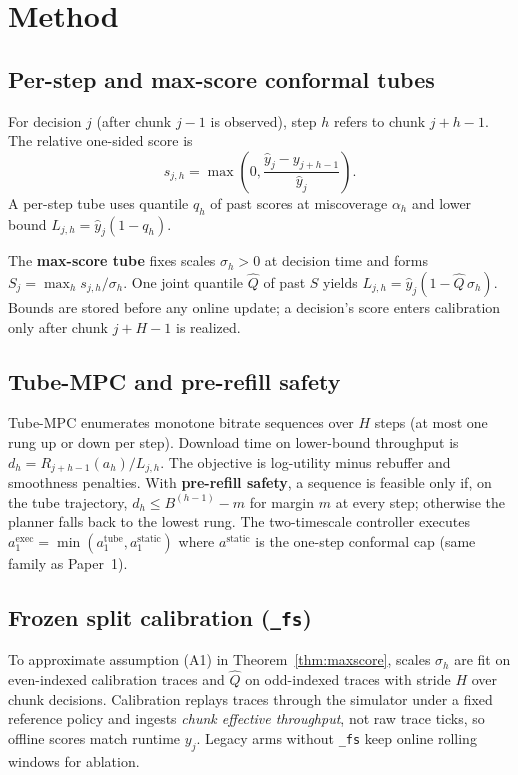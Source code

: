 \section{Method}
\label{sec:method}

\subsection{Per-step and max-score conformal tubes}
\label{sec:method:maxscore}

For decision \(j\) (after chunk \(j{-}1\) is observed), step \(h\) refers to chunk \(j{+}h{-}1\).
The relative one-sided score is
\[
  s_{j,h} = \max\!\left(0,\frac{\hat y_j - y_{j+h-1}}{\hat y_j}\right).
\]
A per-step tube uses quantile \(q_h\) of past scores at miscoverage \(\alpha_h\) and lower bound \(L_{j,h} = \hat y_j(1-q_h)\).

The \textbf{max-score tube} fixes scales \(\sigma_h>0\) at decision time and forms
\(S_j = \max_h s_{j,h}/\sigma_h\).
One joint quantile \(\widehat Q\) of past \(S\) yields
\(L_{j,h} = \hat y_j(1 - \widehat Q\,\sigma_h)\).
Bounds are stored before any online update; a decision's score enters calibration only after chunk \(j{+}H{-}1\) is realized.

\subsection{Tube-MPC and pre-refill safety}
\label{sec:method:mpc}

Tube-MPC enumerates monotone bitrate sequences over \(H\) steps (at most one rung up or down per step).
Download time on lower-bound throughput is \(d_h = R_{j+h-1}(a_h) / L_{j,h}\).
The objective is log-utility minus rebuffer and smoothness penalties.
With \textbf{pre-refill safety}, a sequence is feasible only if, on the tube trajectory,
\(d_h \le B^{(h-1)} - m\) for margin \(m\) at every step; otherwise the planner falls back to the lowest rung.
The two-timescale controller executes \(a^{\mathrm{exec}}_1 = \min(a^{\mathrm{tube}}_1, a^{\mathrm{static}}_1)\) where \(a^{\mathrm{static}}\) is the one-step conformal cap (same family as Paper~1).

\subsection{Frozen split calibration (\texttt{\_fs})}
\label{sec:method:calib}

To approximate assumption (A1) in Theorem~\ref{thm:maxscore}, scales \(\sigma_h\) are fit on even-indexed calibration traces and \(\widehat Q\) on odd-indexed traces with stride \(H\) over chunk decisions.
Calibration replays traces through the simulator under a fixed reference policy and ingests \emph{chunk effective throughput}, not raw trace ticks, so offline scores match runtime \(y_j\).
Legacy arms without \texttt{\_fs} keep online rolling windows for ablation.
